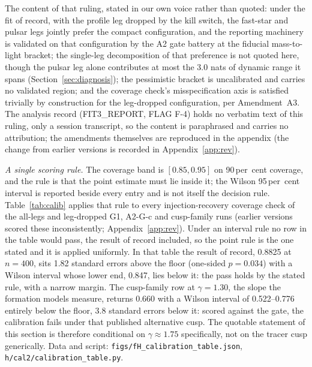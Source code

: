 \documentclass[11pt]{article}
\begin{document}
The content of that ruling, stated in our own voice rather than quoted: under the fit of record, with the profile leg dropped by the kill switch, the fast-star and pulsar legs jointly prefer the compact configuration, and the reporting machinery is validated on that configuration by the A2 gate battery at the fiducial mass-to-light bracket; the single-leg decomposition of that preference is not quoted here, though the pulsar leg alone contributes at most the 3.0 nats of dynamic range it spans (Section~\ref{sec:diagnosis}); the pessimistic bracket is uncalibrated and carries no validated region; and the coverage check's misspecification axis is satisfied trivially by construction for the leg-dropped configuration, per Amendment~A3. The analysis record (FIT3\_REPORT, FLAG F-4) holds no verbatim text of this ruling, only a session transcript, so the content is paraphrased and carries no attribution; the amendments themselves are reproduced in the appendix (the change from earlier versions is recorded in Appendix~\ref{app:rev}).

\emph{A single scoring rule.} The coverage band is $[0.85, 0.95]$ on 90\,per~cent coverage, and the rule is that the point estimate must lie inside it; the Wilson 95\,per~cent interval is reported beside every entry and is not itself the decision rule. Table~\ref{tab:calib} applies that rule to every injection-recovery coverage check of the all-legs and leg-dropped G1, A2-G-c and cusp-family runs (earlier versions scored these inconsistently; Appendix~\ref{app:rev}). Under an interval rule no row in the table would pass, the result of record included, so the point rule is the one stated and it is applied uniformly. In that table the result of record, 0.8825 at $n = 400$, sits 1.82 standard errors above the floor (one-sided $p = 0.034$) with a Wilson interval whose lower end, 0.847, lies below it: the pass holds by the stated rule, with a narrow margin. The cusp-family row at $\gamma = 1.30$, the slope the \citet{GonzalezPrieto2025} formation models measure, returns 0.660 with a Wilson interval of 0.522--0.776 entirely below the floor, 3.8 standard errors below it: scored against the gate, the calibration fails under that published alternative cusp. The quotable statement of this section is therefore conditional on $\gamma \approx 1.75$ specifically, not on the tracer cusp generically. Data and script: \texttt{figs/fH\_calibration\_table.json}, \texttt{h/cal2/calibration\_table.py}.
\end{document}
